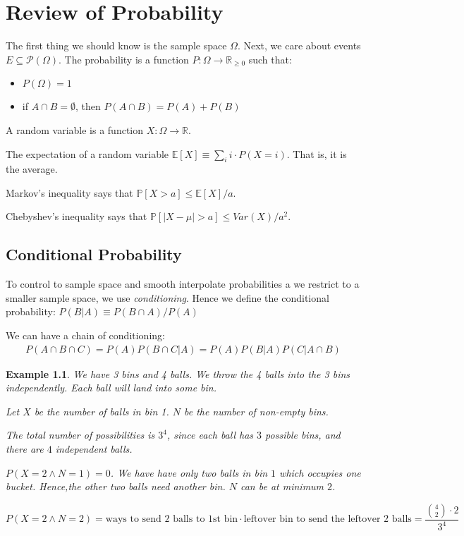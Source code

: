 \documentclass[11pt]{book}
\newcommand{\E}[1]{\ensuremath{\mathbb{E} \left[ #1 \right]}}
\renewcommand{\P}[1]{\ensuremath{\mathbb{P} \left[ #1 \right]}}
\newcommand{\R}{\ensuremath{\mathbb R}}
\newcommand{\Rgezero}{\ensuremath{\mathbb R_{\geq 0}}}
\newcommand{\powerset}{\ensuremath{\mathcal{P}}}
\newtheorem{example}{Example}
\begin{document}
\chapter{Review of Probability}

The first thing we should know is the sample space $\Omega$. Next, we care
about events $E \subseteq \powerset(\Omega)$. The probability is 
a function $P: \Omega \rightarrow \Rgezero$ such that:

\begin{itemize}
    \item $P(\Omega) = 1$
    \item if $A \cap B = \emptyset$, then $P(A \cap B) = P(A) + P(B)$
\end{itemize}


A random variable is a function $X: \Omega \rightarrow \R$.

The expectation of a random variable $\E X \equiv \sum_i i \cdot P(X=i)$.
That is, it is the average.

Markov's inequality says that $\P{X > a} \leq \E{X}/a$.


Chebyshev's inequality says that $\P{|X - \mu| > a} \leq Var(X)/a^2$.

\section{Conditional Probability}

To control to sample space and smooth interpolate probabilities a we 
restrict to a smaller sample space, we use \emph{conditioning}. Hence
we define the conditional probability: $P(B|A) \equiv P(B \cap A) / P(A)$

We can have a chain of conditioning:
\begin{align*}
    P(A \cap B \cap C) = P(A) P(B \cap C | A) = P(A) P(B|A) P(C|A \cap B)
\end{align*}


\begin{example}
    We have 3 bins and 4 balls.
    We throw the 4 balls into the 3 bins independently. Each ball will
    land into some bin.

    Let $X$ be the number of balls in bin 1. $N$ be the number of non-empty
    bins.

    The total number of possibilities is $3^4$, since each ball has $3$
    possible bins, and there are $4$ independent balls.

    $P(X = 2 \land N = 1) = 0$. We have have only two balls in bin $1$
    which occupies one bucket. Hence,the other two balls need another bin.
    $N$ can be at minimum $2$.


    $$P(X = 2 \land N = 2) = 
    \text{ways to send 2 balls to 1st bin}
    \cdot
    \text{leftover bin to send the leftover 2 balls} = 
    \frac{ {4 \choose 2} \cdot 2 }{3^4}$$
\end{example}
\end{document}
